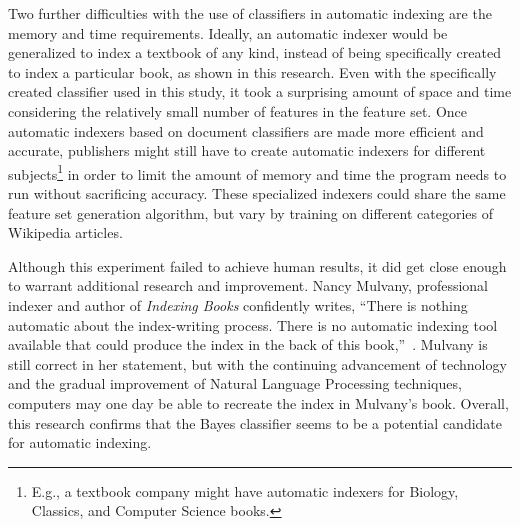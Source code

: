 Two further difficulties with the use of classifiers in automatic indexing are the memory and time requirements.
Ideally, an automatic indexer would be generalized to index a textbook of any kind, instead of being specifically created to index a particular book, as shown in this research.
Even with the specifically created classifier used in this study, it took a surprising amount of space and time considering the relatively small number of features in the feature set.
Once automatic indexers based on document classifiers are made more efficient and accurate, publishers might still have to create automatic indexers for different subjects\footnote{E.g., a textbook company might have automatic indexers for Biology, Classics, and Computer Science books.} in order to limit the amount of memory and time the program needs to run without sacrificing accuracy.
These specialized indexers could share the same feature set generation algorithm, but vary by training on different categories of Wikipedia articles.

Although this experiment failed to achieve human results, it did get close enough to warrant additional research and improvement.
Nancy Mulvany, professional indexer and author of {\it Indexing Books} confidently writes, ``There is nothing automatic about the index-writing process.
There is no automatic indexing tool available that could produce the index in the back of this book,''~\cite{mulvany}.
Mulvany is still correct in her statement, but with the continuing advancement of technology and the gradual improvement of Natural Language Processing techniques, computers may one day be able to recreate the index in Mulvany's book.
Overall, this research confirms that the \naive Bayes classifier seems to be a potential candidate for automatic indexing.